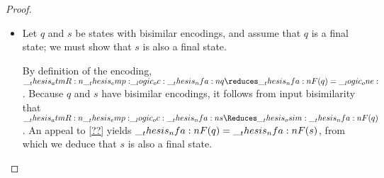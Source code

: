 \begin{proof}
\begin{enumerate}[parsep=0em, listparindent=\parindent]
\begin{itemize}[parsep=0em, listparindent=\parindent]
\begin{itemize}[parsep=0em, listparindent=\parindent]
      \item Let $q$ and $s$ be states with bisimilar encodings, and assume that $q$ is a final state;
        we must show that $s$ is also a final state.

        By definition of the encoding, $\atmR{\emp} \oc \nfa{q} \reduces \nfa{F}(q) = \one$.
        Because $q$ and $s$ have bisimilar encodings, it follows from input bisimilarity that $\atmR{\emp} \oc \nfa{s} \Reduces\osim \nfa{F}(q)$.
        An appeal to \cref{??} yields $\__thesis_nfa:n {F}(q) = \__thesis_nfa:n {F}(s)$, from which we deduce that $s$ is also a final state.
      \end{itemize}
      



        

          

\end{itemize}
\end{enumerate}
\end{proof}

